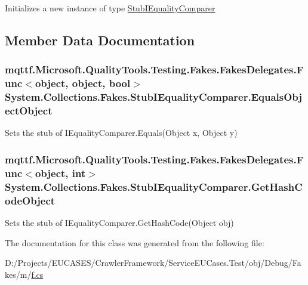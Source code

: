 Initializes a new instance of type \hyperlink{class_system_1_1_collections_1_1_fakes_1_1_stub_i_equality_comparer}{Stub\-I\-Equality\-Comparer}



\subsection{Member Data Documentation}
\hypertarget{class_system_1_1_collections_1_1_fakes_1_1_stub_i_equality_comparer_a9ed9336d0646dd046f873c8249bdaf62}{
\subsubsection[{Equals\-Object\-Object}]{\setlength{\rightskip}{0pt plus 5cm}mqttf.\-Microsoft.\-Quality\-Tools.\-Testing.\-Fakes.\-Fakes\-Delegates.\-Func$<$object, object, bool$>$ System.\-Collections.\-Fakes.\-Stub\-I\-Equality\-Comparer.\-Equals\-Object\-Object}}\label{class_system_1_1_collections_1_1_fakes_1_1_stub_i_equality_comparer_a9ed9336d0646dd046f873c8249bdaf62}


Sets the stub of I\-Equality\-Comparer.\-Equals(\-Object x, Object y)

\hypertarget{class_system_1_1_collections_1_1_fakes_1_1_stub_i_equality_comparer_a701e1922d6f2b7c4975686a3f292aae0}{
\subsubsection[{Get\-Hash\-Code\-Object}]{\setlength{\rightskip}{0pt plus 5cm}mqttf.\-Microsoft.\-Quality\-Tools.\-Testing.\-Fakes.\-Fakes\-Delegates.\-Func$<$object, int$>$ System.\-Collections.\-Fakes.\-Stub\-I\-Equality\-Comparer.\-Get\-Hash\-Code\-Object}}\label{class_system_1_1_collections_1_1_fakes_1_1_stub_i_equality_comparer_a701e1922d6f2b7c4975686a3f292aae0}


Sets the stub of I\-Equality\-Comparer.\-Get\-Hash\-Code(\-Object obj)



The documentation for this class was generated from the following file\-:\begin{DoxyCompactItemize}
\item 
D\-:/\-Projects/\-E\-U\-C\-A\-S\-E\-S/\-Crawler\-Framework/\-Service\-E\-U\-Cases.\-Test/obj/\-Debug/\-Fakes/m/\hyperlink{m_2f_8cs}{f.\-cs}\end{DoxyCompactItemize}
